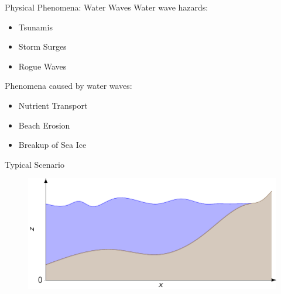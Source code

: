 \documentclass[pdf]{beamer}
\begin{document}
\begin{frame}{Physical Phenomena: Water Waves}
	Water wave hazards:
		\begin{itemize}
			\item Tsunamis
			\item Storm Surges
			\item Rogue Waves
		\end{itemize}
	\smallskip
	Phenomena caused by water waves:
		\begin{itemize}
			\item Nutrient Transport
			\item Beach Erosion
			\item Breakup of Sea Ice
		\end{itemize}
\end{frame}
\begin{frame}{Typical Scenario}
	\begin{figure}
		\includegraphics[width=\textwidth]{./Pics/WaterModelDiagrams/FressSurface.pdf}
	\end{figure}
\end{frame}
\end{document}
